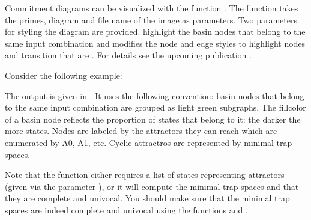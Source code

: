 \documentclass[letterpaper,10pt,english]{sphinxmanual}
\begin{document}
Commitment diagrams can be visualized with the function .
The function takes the primes, diagram and file name of the image as parameters.
Two parameters for styling the diagram are provided.
 highlight the basin nodes that belong to the same input combination and  modifies the node and edge styles to
highlight nodes and transition that are . For details see the upcoming publication {\hyperref[\detokenize{Bibliography:klarner2016basins}]{}}.

Consider the following example:

\begin{sphinxVerbatim}[commandchars=\\\{\}]
  
    
\end{sphinxVerbatim}

The output is given in {\hyperref[\detokenize{Manual:figure26}]{}}.
It uses the following convention: basin nodes that belong to the same input combination are grouped as light green subgraphs.
The fillcolor of a basin node reflects the proportion of states that belong to it: the darker the more states.
Nodes are labeled by the attractors they can reach which are enumerated by A0, A1, etc.
Cyclic attractros are represented by minimal trap spaces.

Note that the function {\hyperref[\detokenize{Basins:commitment-diagram}]{}} either requires a list of states representing attractors (given via the parameter ),
or it will compute the minimal trap spaces and  that they are complete and univocal.
You should make sure that the minimal trap spaces are indeed complete and univocal using the functions {\hyperref[\detokenize{Attractors:completeness}]{}} and {\hyperref[\detokenize{Attractors:univocality}]{}}.
\end{document}
